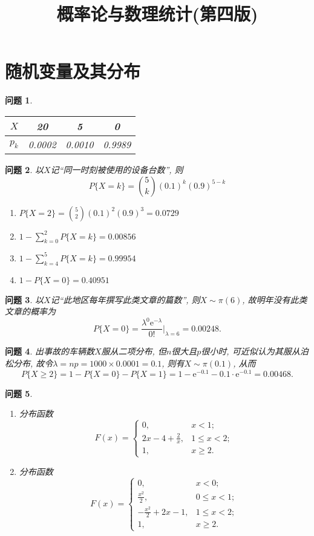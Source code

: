 \documentclass[a4paper]{article}
\newcommand{\e}{\mathrm{e}}
\newcommand{\disp}{\displaystyle}
\theoremstyle{mystyle}
\newtheorem{prob}{问题}[section]
\begin{document}
	\title{\huge \heiti 概率论与数理统计(第四版)}
	\maketitle
	\setcounter{section}{1}
	\section{\heiti 随机变量及其分布}
	\begin{prob}
		\begin{tabular}{c|ccc}
		$X$ & 20 & 5 & 0\\
		\hline
		$p_k$ & 0.0002 & 0.0010 & 0.9989
		\end{tabular}
	\end{prob}
	\setcounter{prob}{5}
	\begin{prob}
		以$X$记``同一时刻被使用的设备台数'', 则
		\[
			P\{X=k\}={5\choose k}(0.1)^k(0.9)^{5-k}
		\]
		\begin{enumerate}[{(}1{)}]
			\item
			$\displaystyle P\{X=2\}={5\choose 2}(0.1)^2(0.9)^{3}=0.0729$
			\item
			$\displaystyle 1-\sum_{k=0}^2P\{X=k\}=0.00856$
			\item
			$\displaystyle 1-\sum_{k=4}^5 P\{X=k\}=0.99954$
			\item
			$\displaystyle 1-P\{X=0\}=0.40951$
		\end{enumerate}
	\end{prob}
	\setcounter{prob}{10}
	\begin{prob}
		以$X$记``此地区每年撰写此类文章的篇数'', 则$X\sim \pi(6)$, 故明年没有此类文章的概率为
		\[
			P\{X=0\}=\frac{\lambda^0\e^{-\lambda}}{0!}\Bigg|_{\lambda=6}=0.00248.
		\]
	\end{prob}
	\setcounter{prob}{15}
	\begin{prob}
		出事故的车辆数$X$服从二项分布, 但$n$很大且$p$很小时, 可近似认为其服从泊松分布, 故令$\lambda =np=1000\times 0.0001=0.1$, 则有$X\sim\pi(0.1)$, 从而
		\[
			P\{X\geqslant 2\}=1-P\{X=0\}-P\{X=1\}=1-\e^{-0.1}-0.1\cdot\e^{-0.1}=0.00468.
		\]
	\end{prob}
	\setcounter{prob}{20}
	\begin{prob}
		\begin{enumerate}[{(}1{)}]
			\item
			分布函数
			\[
				F(x)=
				\begin{cases}
				0,&x<1;\\
				\disp 2x-4+\frac{2}{x}, & 1\leqslant x< 2;\\
				1, &x\geqslant2.
				\end{cases}
			\]
			\item
			分布函数
			\[
				F(x)=
				\begin{cases}
				0, & x<0;\\
				\disp\frac{x^2}{2}, & 0\leqslant x <1;\\
				\disp -\frac{x^2}{2}+2x-1, &1\leqslant x<2;\\
				1,& x\geqslant 2.
				\end{cases}
			\]
		\end{enumerate}
	\end{prob}
\end{document}
